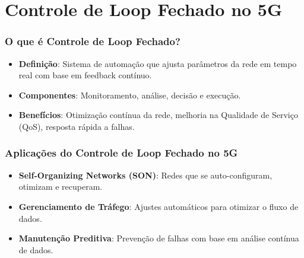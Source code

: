 
\section{Controle de Loop Fechado no 5G}
\begin{frame}
    \frametitle{O que é Controle de Loop Fechado?}
    \begin{itemize}
        \item \textbf{Definição}: Sistema de automação que ajusta parâmetros da rede em tempo real com base em feedback contínuo.
        \item \textbf{Componentes}: Monitoramento, análise, decisão e execução.
        \item \textbf{Benefícios}: Otimização contínua da rede, melhoria na Qualidade de Serviço (QoS), resposta rápida a falhas.
    \end{itemize}
\end{frame}

\begin{frame}
    \frametitle{Aplicações do Controle de Loop Fechado no 5G}
    \begin{itemize}
        \item \textbf{Self-Organizing Networks (SON)}: Redes que se auto-configuram, otimizam e recuperam.
        \item \textbf{Gerenciamento de Tráfego}: Ajustes automáticos para otimizar o fluxo de dados.
        \item \textbf{Manutenção Preditiva}: Prevenção de falhas com base em análise contínua de dados.
    \end{itemize}
\end{frame}